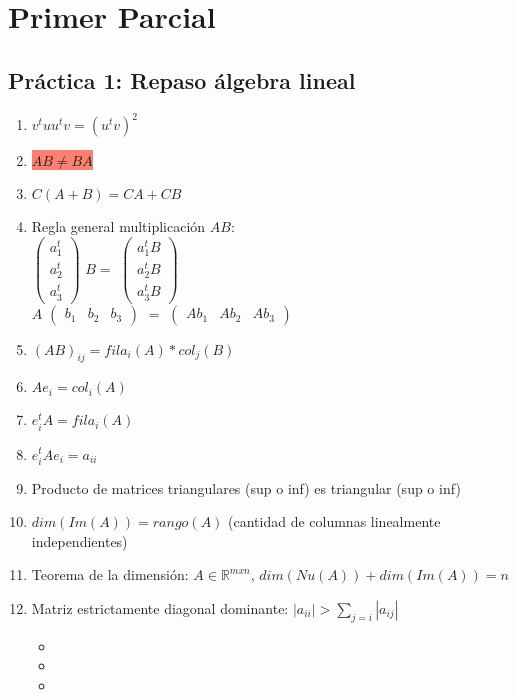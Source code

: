 \section*{Primer Parcial}
\subsection*{Práctica 1: Repaso álgebra lineal}
\begin{enumerate}
    \item $v^tuu^tv = (u^tv)^2$
    \item \colorbox{Salmon}{$AB \neq BA$}
    \item $C(A+B) = CA + CB$
    \item Regla general multiplicación $AB$: \\
    $ \begin{pmatrix}
a_1^t \\
a_2^t \\
a_3^t 
\end{pmatrix}$ $B = $ $\begin{pmatrix}
a_1^t B \\
a_2^tB \\
a_3^tB 
\end{pmatrix} $ \\
\linebreak
$A$ $ \begin{pmatrix}
b_1 & b_2 & b_3 
\end{pmatrix} $   $=$ $\begin{pmatrix}
Ab_1 & Ab_2 & Ab_3 
\end{pmatrix}  $
    \item $(AB)_{ij} = fila_i(A)*col_j(B)$
    \item $Ae_{i} = col_i(A)$
    \item $e_i^tA = fila_i(A)$
    \item $e_i^tAe_i = a_{ii}$
    \item Producto de matrices triangulares (sup o inf) es triangular (sup o inf)
    \item $dim(Im(A)) = rango(A)$ (cantidad de columnas linealmente independientes)
    \item Teorema de la dimensión: $A \in \mathbb{R}^{mxn}$, $dim(Nu(A)) + dim(Im(A)) = n$
    \item Matriz estrictamente diagonal dominante: $|a_{ii}| > \sum_{j=i}{}|a_{ij}|$
    \begin{itemize}
    \item {}
	\item {}
	\item {}


\end{itemize}
\end{enumerate}
